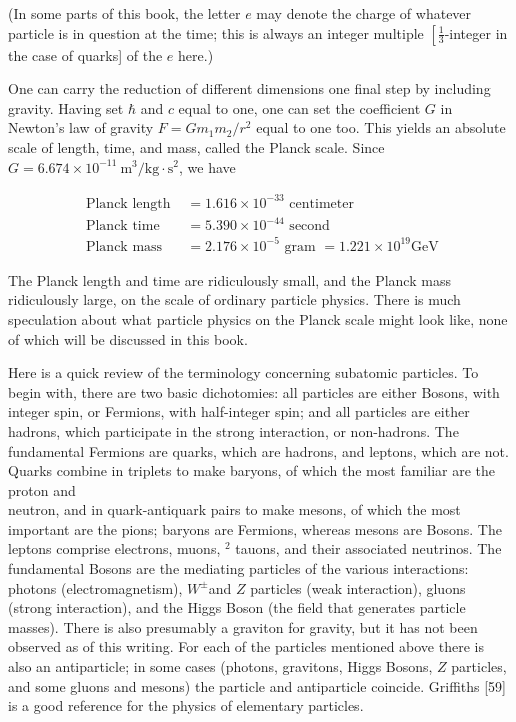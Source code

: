 \documentclass[10pt, letterpaper]{article}
\begin{document}
(In some parts of this book, the letter $e$ may denote the charge of whatever particle is in question at the time; this is always an integer multiple $\left[\frac{1}{3}\right.$-integer in the case of quarks] of the $e$ here.)

One can carry the reduction of different dimensions one final step by including gravity. Having set $\hbar$ and $c$ equal to one, one can set the coefficient $G$ in Newton's law of gravity $F=G m_{1} m_{2} / r^{2}$ equal to one too. This yields an absolute scale of length, time, and mass, called the Planck scale. Since $G=6.674 \times 10^{-11} \mathrm{~m}^{3} / \mathrm{kg} \cdot \mathrm{s}^{2}$, we have

$$
\begin{aligned}
\text { Planck length } & =1.616 \times 10^{-33} \text { centimeter } \\
\text { Planck time } & =5.390 \times 10^{-44} \text { second } \\
\text { Planck mass } & =2.176 \times 10^{-5} \text { gram }=1.221 \times 10^{19} \mathrm{GeV}
\end{aligned}
$$

The Planck length and time are ridiculously small, and the Planck mass ridiculously large, on the scale of ordinary particle physics. There is much speculation about what particle physics on the Planck scale might look like, none of which will be discussed in this book.

Here is a quick review of the terminology concerning subatomic particles. To begin with, there are two basic dichotomies: all particles are either Bosons, with integer spin, or Fermions, with half-integer spin; and all particles are either hadrons, which participate in the strong interaction, or non-hadrons. The fundamental Fermions are quarks, which are hadrons, and leptons, which are not. Quarks combine in triplets to make baryons, of which the most familiar are the proton and\\
neutron, and in quark-antiquark pairs to make mesons, of which the most important are the pions; baryons are Fermions, whereas mesons are Bosons. The leptons comprise electrons, muons, ${ }^{2}$ tauons, and their associated neutrinos. The fundamental Bosons are the mediating particles of the various interactions: photons (electromagnetism), $W^{ \pm}$and $Z$ particles (weak interaction), gluons (strong interaction), and the Higgs Boson (the field that generates particle masses). There is also presumably a graviton for gravity, but it has not been observed as of this writing. For each of the particles mentioned above there is also an antiparticle; in some cases (photons, gravitons, Higgs Bosons, $Z$ particles, and some gluons and mesons) the particle and antiparticle coincide. Griffiths [59] is a good reference for the physics of elementary particles.
\end{document}
